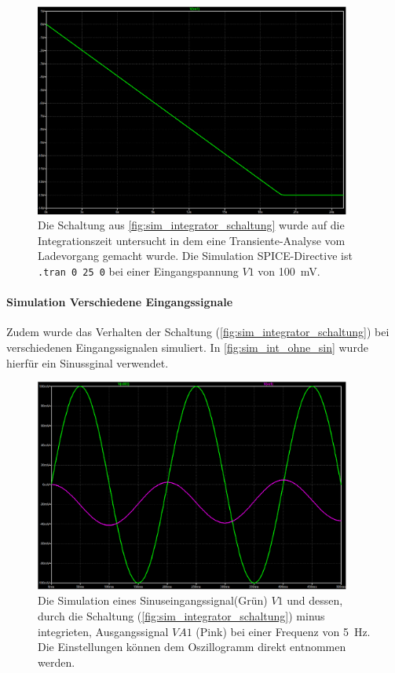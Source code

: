 \documentclass[12pt,english,ngerman]{scrartcl}
\begin{document}
\begin{figure}[H]
  \centering
    \includegraphics[width=\linewidth, height=7cm]{./figures/integrator/sim/umkehr_int/dauer_aussteu.png}
  \caption{Die Schaltung aus \autoref{fig:sim_integrator_schaltung} wurde auf
  die Integrationszeit untersucht in dem eine Transiente-Analyse vom
  Ladevorgang gemacht wurde. Die Simulation SPICE-Directive ist \texttt{.tran 0 25 0} 
  bei einer Eingangspannung $V1$ von \SI{100}{\milli\volt}.}
  \label{fig:sim_integrator_integrationszeit}
\end{figure}

\paragraph{Simulation Verschiedene Eingangssignale}
Zudem wurde das Verhalten der Schaltung
(\autoref{fig:sim_integrator_schaltung}) bei verschiedenen Eingangssignalen
simuliert. In \autoref{fig:sim_int_ohne_sin} wurde hierfür ein Sinussginal verwendet.

\begin{figure}[H]
  \centering
    \includegraphics[width=\linewidth, height=7cm]{./figures/integrator/sim/umkehr_int/sin_100mv_5hz.png}
    \caption{Die Simulation eines Sinuseingangssignal(Grün) $V1$ und dessen, durch
    die Schaltung (\autoref{fig:sim_integrator_schaltung}) minus integrieten,
  Ausgangssignal $VA1$ (Pink) bei einer Frequenz von \SI{5}{\hertz}. Die
Einstellungen können dem Oszillogramm direkt entnommen werden.}
  \label{fig:sim_int_ohne_sin}
\end{figure}
\end{document}
